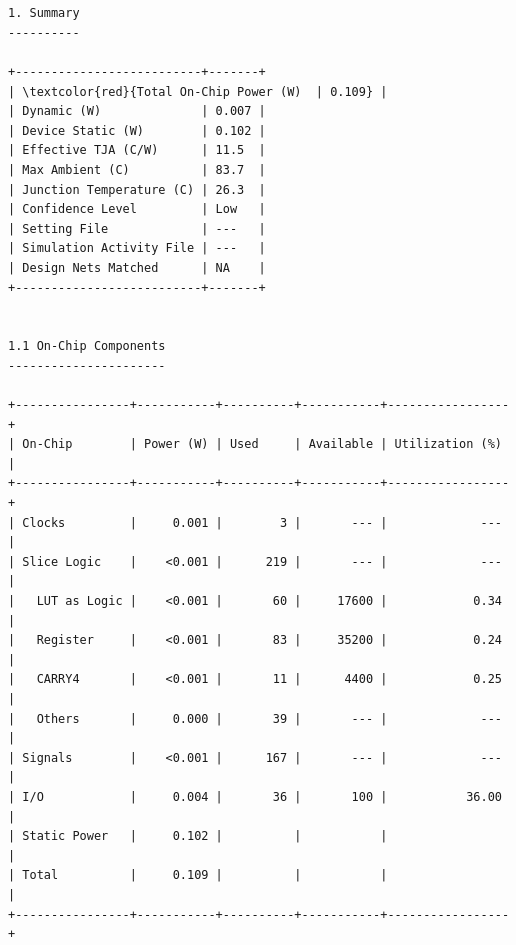 \documentclass[12pt, a4paper]{article}
\begin{document}
\begin{Verbatim}[commandchars=\\\{\}]


1. Summary
----------

+--------------------------+-------+
| \textcolor{red}{Total On-Chip Power (W)  | 0.109} |
| Dynamic (W)              | 0.007 |
| Device Static (W)        | 0.102 |
| Effective TJA (C/W)      | 11.5  |
| Max Ambient (C)          | 83.7  |
| Junction Temperature (C) | 26.3  |
| Confidence Level         | Low   |
| Setting File             | ---   |
| Simulation Activity File | ---   |
| Design Nets Matched      | NA    |
+--------------------------+-------+


1.1 On-Chip Components
----------------------

+----------------+-----------+----------+-----------+-----------------+
| On-Chip        | Power (W) | Used     | Available | Utilization (%) |
+----------------+-----------+----------+-----------+-----------------+
| Clocks         |     0.001 |        3 |       --- |             --- |
| Slice Logic    |    <0.001 |      219 |       --- |             --- |
|   LUT as Logic |    <0.001 |       60 |     17600 |            0.34 |
|   Register     |    <0.001 |       83 |     35200 |            0.24 |
|   CARRY4       |    <0.001 |       11 |      4400 |            0.25 |
|   Others       |     0.000 |       39 |       --- |             --- |
| Signals        |    <0.001 |      167 |       --- |             --- |
| I/O            |     0.004 |       36 |       100 |           36.00 |
| Static Power   |     0.102 |          |           |                 |
| Total          |     0.109 |          |           |                 |
+----------------+-----------+----------+-----------+-----------------+


\end{Verbatim}





\newpage
\end{document}
